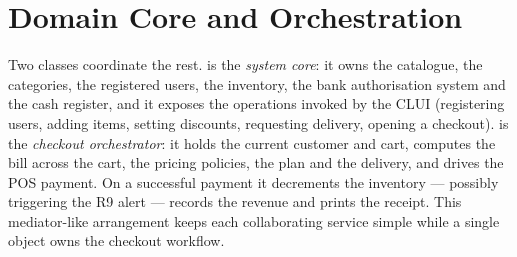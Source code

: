 \section{Domain Core and Orchestration}
Two classes coordinate the rest.  is the \emph{system core}: it
owns the catalogue, the categories, the registered users, the inventory, the
bank authorisation system and the cash register, and it exposes the operations
invoked by the CLUI (registering users, adding items, setting discounts,
requesting delivery, opening a checkout).  is the
\emph{checkout orchestrator}: it holds the current customer and cart, computes
the bill across the cart, the pricing policies, the plan and the delivery, and
drives the POS payment. On a successful payment it decrements the inventory ---
possibly triggering the R9 alert --- records the revenue and prints the receipt.
This mediator-like arrangement keeps each collaborating service simple while a
single object owns the checkout workflow.
